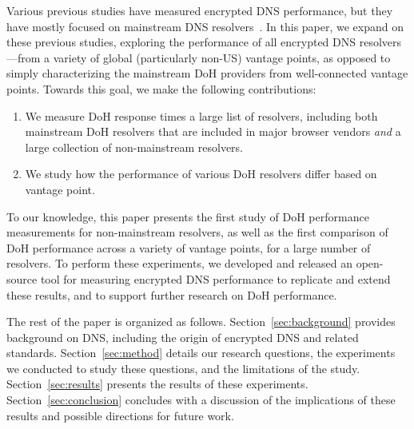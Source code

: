 Various previous studies have measured encrypted DNS performance, but they have mostly focused on mainstream DNS resolvers~\cite{borgolte2019dns,hounsel2020comparing,KResolver,lu2019end-to-end}.
In this paper, we expand on these previous studies, exploring the performance
of all encrypted DNS resolvers---from a variety of global (particularly
non-US) vantage points, as opposed to simply characterizing the mainstream DoH
providers from well-connected vantage points.
Towards this goal, we make the following contributions:
\begin{enumerate}
    \itemsep=-1pt
    \item We measure DoH response times a large list of resolvers, including
        both mainstream DoH resolvers that are included in major browser
        vendors {\em and} a large collection of non-mainstream resolvers.
    \item We study how the performance of various DoH resolvers differ based
        on vantage point.
\end{enumerate}
\noindent
To our knowledge, this paper presents the first study of DoH performance
measurements for non-mainstream resolvers, as well as the first comparison of
DoH performance across a variety of vantage points, for a large number of
resolvers.
To perform these experiments, we developed and released an open-source
tool for measuring encrypted DNS performance to replicate and extend these
results, and to support further research on DoH performance.

The rest of the paper is organized as follows.  Section~\ref{sec:background}
provides background on DNS, including the origin of encrypted DNS and related
standards.  Section~\ref{sec:method} details our research questions, the
experiments we conducted to study these questions, and the limitations of the
study.  Section~\ref{sec:results} presents the results of these experiments.
Section~\ref{sec:conclusion} concludes with a discussion of the implications
of these results and possible directions for future work. 

